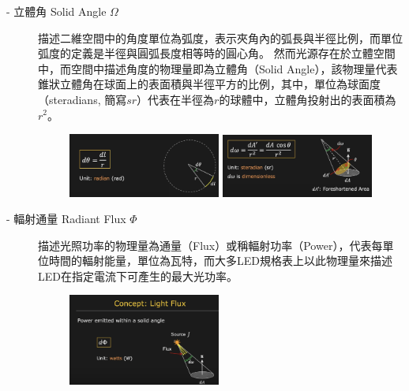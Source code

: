         
        \begin{description}
            \item[- 立體角 Solid Angle $\Omega$] \hfill
                
                描述二維空間中的角度單位為弧度，表示夾角內的弧長與半徑比例，而單位弧度的定義是半徑與圓弧長度相等時的圓心角。
                然而光源存在於立體空間中，而空間中描述角度的物理量即為立體角（Solid Angle），該物理量代表錐狀立體角在球面上的表面積與半徑平方的比例，其中，單位為球面度（steradians, 簡寫$sr$）代表在半徑為$r$的球體中，立體角投射出的表面積為$r^2$。

                \begin{figure}[ht]
                    \centering
                    \includegraphics[width=5cm]{00temppic/1.png}
                    \includegraphics[width=5cm]{00temppic/2.png}
                \end{figure}

            \item[- 輻射通量 Radiant Flux $\Phi$]  \hfill
                
                描述光照功率的物理量為通量（Flux）或稱輻射功率（Power），代表每單位時間的輻射能量，單位為瓦特，而大多LED規格表上以此物理量來描述LED在指定電流下可產生的最大光功率。

                \begin{figure}[ht]
                    \centering
                    \includegraphics[width=5cm]{00temppic/3.png}
                \end{figure}


\end{description}
